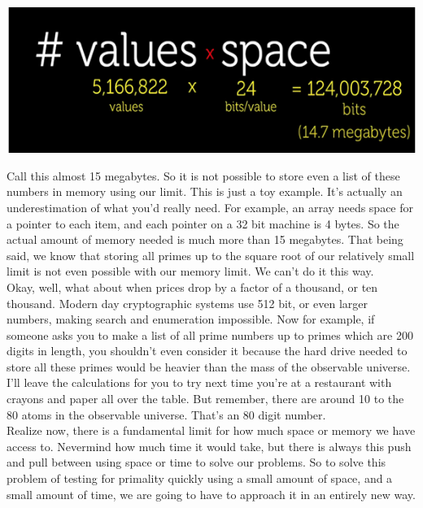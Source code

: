 \documentclass{report}
\begin{document}
\begin{center}
	\includegraphics[scale=1]{67.png}
\end{center}
Call this almost 15 megabytes. So it is not possible to store even a list of these numbers in memory using our limit. This is just a toy example. It's actually an underestimation of what you'd really need. For example, an array needs space for a pointer to each item, and each pointer on a 32 bit machine is 4 bytes. So the actual amount of memory needed is much more than 15 megabytes. That being said, we know that storing all primes up to the square root of our relatively small limit is not even possible with our memory limit. We can't do it this way. \\
Okay, well, what about when prices drop by a factor of a thousand, or ten thousand. Modern day cryptographic systems use 512 bit, or even larger numbers, making search and enumeration impossible. Now for example, if someone asks you to make a list of all prime numbers up to primes which are 200 digits in length, you shouldn't even consider it because the hard drive needed to store all these primes would be heavier than the mass of the observable universe. I'll leave the calculations for you to try next time you're at a restaurant with crayons and paper all over the table. But remember, there are around 10 to the 80 atoms in the observable universe. That's an 80 digit number.\\ 
Realize now, there is a fundamental limit for how much space or memory we have access to. Nevermind how much time it would take, but there is always this push and pull between using space or time to solve our problems. So to solve this problem of testing for primality quickly using a small amount of space, and a small amount of time, we are going to have to approach it in an entirely new way.\\
\end{document}
